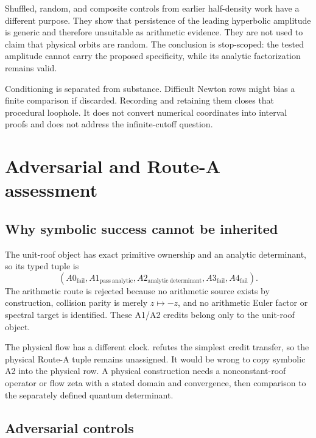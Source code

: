 \documentclass[11pt,a4paper]{article}
\theoremstyle{definition}
\theoremstyle{remark}
\begin{document}
Shuffled, random, and composite controls from earlier half-density work have a different purpose. They show that persistence of the leading hyperbolic amplitude is generic and therefore unsuitable as arithmetic evidence. They are not used to claim that physical orbits are random. The conclusion is stop-scoped: the tested amplitude cannot carry the proposed specificity, while its analytic factorization remains valid.

Conditioning is separated from substance. Difficult Newton rows might bias a finite comparison if discarded. Recording and retaining them closes that procedural loophole. It does not convert numerical coordinates into interval proofs and does not address the infinite-cutoff question.

\section{Adversarial and Route-A assessment}

\subsection{Why symbolic success cannot be inherited}

The unit-roof object has exact primitive ownership and an analytic determinant, so its typed tuple is
\[
 (A0_{\mathrm{fail}},A1_{\mathrm{pass\ analytic}},
 A2_{\mathrm{analytic\ determinant}},A3_{\mathrm{fail}},A4_{\mathrm{fail}}).
\]
The arithmetic route is rejected because no arithmetic source exists by construction, collision parity is merely \(z\mapsto-z\), and no arithmetic Euler factor or spectral target is identified. These A1/A2 credits belong only to the unit-roof object.

The physical flow has a different clock.  refutes the simplest credit transfer, so the physical Route-A tuple remains unassigned. It would be wrong to copy symbolic A2 into the physical row. A physical construction needs a nonconstant-roof operator or flow zeta with a stated domain and convergence, then comparison to the separately defined quantum determinant.

\subsection{Adversarial controls}
\end{document}
